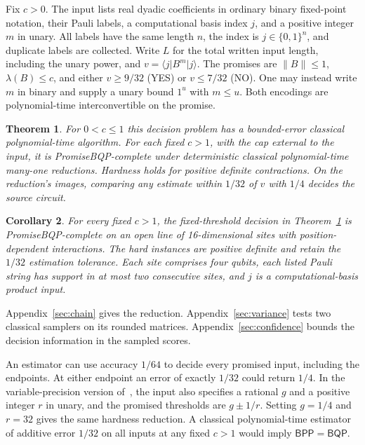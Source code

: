 \documentclass[11pt]{article}
\newtheorem{theorem}{Theorem}
\newtheorem{corollary}[theorem]{Corollary}
\newcommand{\ket}[1]{\lvert #1\rangle}
\newcommand{\bra}[1]{\langle #1\rvert}
\newcommand{\norm}[1]{\lVert #1\rVert}
\newcommand{\BPP}{\mathsf{BPP}}
\newcommand{\BQP}{\mathsf{BQP}}
\begin{document}
Fix \(c>0\). The input lists real dyadic coefficients in ordinary binary fixed-point notation, their Pauli labels, a computational basis index \(j\), and a positive integer \(m\) in unary. All labels have the same length \(n\), the index is \(j\in\{0,1\}^n\), and duplicate labels are collected. Write \(L\) for the total written input length, including the unary power, and \(v=\bra j B^m\ket j\). The promises are \(\norm B\le1\), \(\lambda(B)\le c\), and either \(v\ge9/32\) (YES) or \(v\le7/32\) (NO). One may instead write \(m\) in binary and supply a unary bound \(1^u\) with \(m\le u\). Both encodings are polynomial-time interconvertible on the promise.

\begin{theorem}\label{thm:main}
For \(0<c\le1\) this decision problem has a bounded-error classical polynomial-time algorithm. For each fixed \(c>1\), with the cap external to the input, it is PromiseBQP-complete under deterministic classical polynomial-time many-one reductions. Hardness holds for positive definite contractions. On the reduction's images, comparing any estimate within \(1/32\) of \(v\) with \(1/4\) decides the source circuit.
\end{theorem}

\begin{corollary}\label{cor:line}
For every fixed \(c>1\), the fixed-threshold decision in Theorem~\ref{thm:main} is PromiseBQP-complete on an open line of 16-dimensional sites with position-dependent interactions. The hard instances are positive definite and retain the \(1/32\) estimation tolerance. Each site comprises four qubits, each listed Pauli string has support in at most two consecutive sites, and \(j\) is a computational-basis product input.
\end{corollary}
Appendix~\ref{sec:chain} gives the reduction. Appendix~\ref{sec:variance} tests two classical samplers on its rounded matrices. Appendix~\ref{sec:confidence} bounds the decision information in the sampled scores.

An estimator can use accuracy \(1/64\) to decide every promised input, including the endpoints. At either endpoint an error of exactly \(1/32\) could return \(1/4\). In the variable-precision version of~\cite{vone}, the input also specifies a rational \(g\) and a positive integer \(r\) in unary, and the promised thresholds are \(g\pm1/r\). Setting \(g=1/4\) and \(r=32\) gives the same hardness reduction. A classical polynomial-time estimator of additive error \(1/32\) on all inputs at any fixed \(c>1\) would imply \(\BPP=\BQP\).
\end{document}

